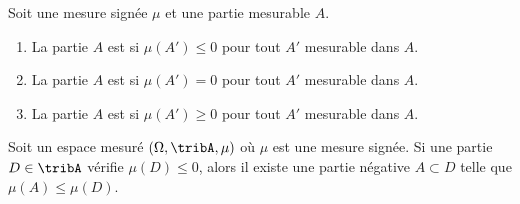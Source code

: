 					 \begin{definition}
					 Soit une mesure signée \( \mu\) et une partie mesurable \( A\).
					 \begin{enumerate}
					 \item
					 La partie \( A\) est  si \( \mu(A')\leq 0\) pour tout \( A'\) mesurable dans \( A\).
					 \item
					 La partie \( A\) est  si \( \mu(A')= 0\) pour tout \( A'\) mesurable dans \( A\).
					 \item
					 La partie \( A\) est  si \( \mu(A')\geq0\) pour tout \( A'\) mesurable dans \( A\).
					 \end{enumerate}
					 \end{definition}


					 \begin{proposition}		\label{PROPooBLNXooRRxxVv}
					 Soit un espace mesuré \( (\Omega,\tribA,\mu)\) où \( \mu\) est une mesure signée. Si une partie \( D\in \tribA\) vérifie \( \mu(D)\leq 0\), alors il existe une partie négative \( A\subset D\) telle que \( \mu(A)\leq \mu(D)\).
					 \end{proposition}

